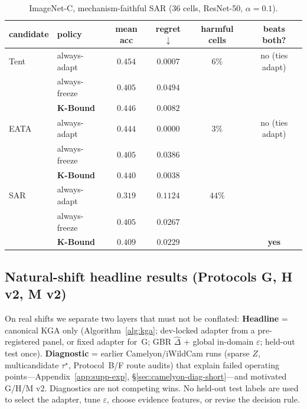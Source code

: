 \documentclass[11pt]{article}
\theoremstyle{plain}
\theoremstyle{definition}
\theoremstyle{remark}
\begin{document}
\begin{table}[t]\centering\small
\begin{tabular}{llcccc}
\toprule
candidate & policy & mean acc & regret$\downarrow$ & harmful cells & beats both? \\
\midrule
Tent & always-adapt     & $\mathbf{0.454}$ & $0.0007$ & $6\%$  & no (ties adapt) \\
     & always-freeze    & $0.405$          & $0.0494$ &        & \\
     & \textbf{K-Bound} & $0.446$          & $0.0082$ &        & \\
\midrule
EATA & always-adapt     & $\mathbf{0.444}$ & $0.0000$ & $3\%$  & no (ties adapt) \\
     & always-freeze    & $0.405$          & $0.0386$ &        & \\
     & \textbf{K-Bound} & $0.440$          & $0.0038$ &        & \\
\midrule
SAR  & always-adapt     & $0.319$          & $0.1124$ & $44\%$ & \\
     & always-freeze    & $0.405$          & $0.0267$ &        & \\
     & \textbf{K-Bound} & $\mathbf{0.409}$ & $\mathbf{0.0229}$ & & \textbf{yes} \\
\bottomrule
\end{tabular}
\caption{ImageNet-C, mechanism-faithful SAR ($36$ cells, ResNet-50, $\alpha{=}0.1$).}
\label{tab:imagenetc-faithful}
\end{table}

\subsection{Natural-shift headline results (Protocols G, H v2, M v2)}\label{sec:nat-shift-headline}
On real shifts we separate two layers that must not be conflated:
\textbf{Headline} = canonical \textsc{KGA} only (Algorithm~\ref{alg:kga}; dev-locked adapter
from a pre-registered panel, or fixed adapter for~G; GBR $\widehat\Delta$ + global
in-domain $\varepsilon$; held-out test once).
\textbf{Diagnostic} = earlier Camelyon/iWildCam runs (sparse $Z$, multicandidate $\tau^\star$,
Protocol~B/F route audits) that explain failed operating points---Appendix~\ref{app:supp-exp},
\S\ref{sec:camelyon-diag-short}---and motivated G/H/M v2. Diagnostics are not competing wins.
No held-out test labels are used to select the adapter, tune $\varepsilon$, choose evidence
features, or revise the decision rule.
\end{document}
